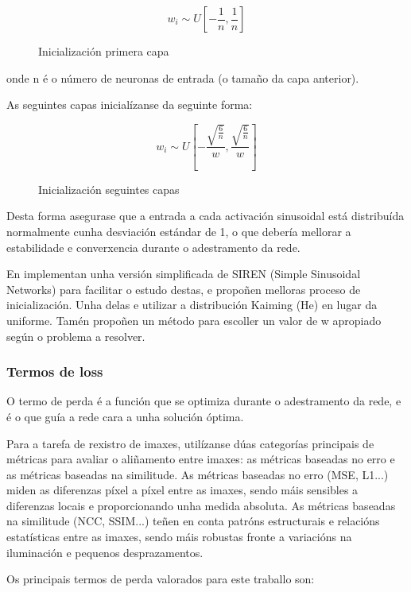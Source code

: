 \begin{figure}[ht!]
    \centering
    \[
    w_i \sim U\left[ -\frac{1}{n}, \frac{1}{n} \right]
    \]

\caption{Inicialización primera capa}
\end{figure}

onde n é o número de neuronas de entrada (o tamaño da capa anterior).

As seguintes capas inicialízanse da seguinte forma:
\begin{figure}[ht!]
    \centering
    \[
    w_i \sim U\left[ -\frac{\sqrt{\frac{6}{n}}}{w}, \frac{\sqrt{\frac{6}{n}}}{w} \right]
    \]
    \caption{Inicialización seguintes capas}
\end{figure}

Desta forma asegurase que a entrada a cada activación sinusoidal está distribuída normalmente cunha desviación estándar de 1,
 o que debería mellorar a estabilidade e converxencia durante o adestramento da rede.

En \cite{sireninit} implementan unha versión simplificada de SIREN (Simple Sinusoidal Networks) para facilitar o estudo destas, 
e propoñen melloras proceso de inicialización. Unha delas e utilizar a distribución Kaiming (He) en lugar da uniforme.
Tamén propoñen un método para escoller un valor de w apropiado según o problema a resolver.

\subsubsection{Termos de loss}
\label{subsubsec:Termos de loss}

O termo de perda é a función que se optimiza durante o adestramento da rede, e é o que guía a rede cara a unha solución óptima.

Para a tarefa de rexistro de imaxes, utilízanse dúas categorías principais de métricas para avaliar o aliñamento entre imaxes: 
as métricas baseadas no erro e as métricas baseadas na similitude. As métricas baseadas no erro (MSE, L1...) miden as diferenzas píxel a píxel entre as imaxes, 
sendo máis sensibles a diferenzas locais e proporcionando unha medida absoluta. 
As métricas baseadas na similitude (NCC, SSIM...) teñen en conta patróns estructurais e relacións estatísticas entre as imaxes, sendo máis robustas fronte a variacións na iluminación e pequenos desprazamentos.
\cite{simmetric}

Os principais termos de perda valorados para este traballo son:

